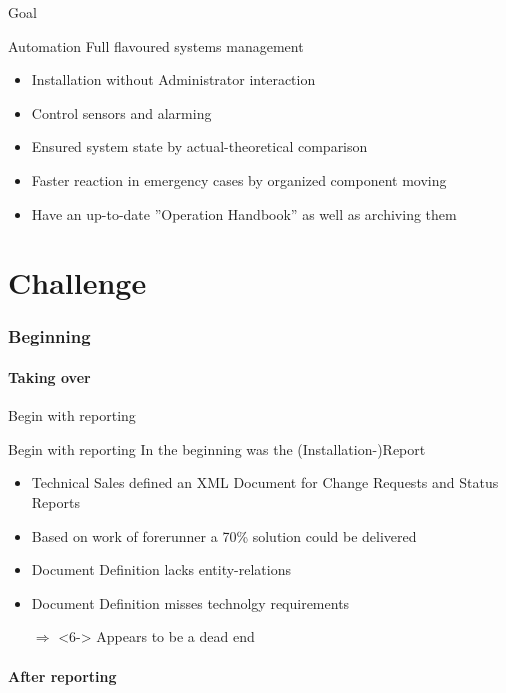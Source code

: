 \documentclass[ngerman,xcolor={table,dvipsnames},smaller,compress,hyperref={bookmarks,colorlinks}]{beamer}%
\begin{document}
\begin{frame}[fragile]{Goal}
\begin{block}{Automation}
Full flavoured systems management
\begin{itemize}
\item<2-> Installation without Administrator interaction
\item<3-> Control sensors and alarming
\item<4-> Ensured system state by actual-theoretical comparison
\item<5-> Faster reaction in emergency cases by organized component moving
\item<6-> Have an up-to-date ''Operation Handbook'' as well as archiving them
\end{itemize}
\end{block}
\end{frame}

\part{Challenge}

\section{Beginning}

\subsection{Taking over}

\begin{frame}[fragile]{Begin with reporting}
\begin{block}{Begin with reporting}
In the beginning was the (Installation-)Report
\begin{itemize}
\item<2-> Technical Sales defined an XML Document for Change Requests and Status Reports
\item<3-> Based on work of forerunner a 70\% solution could be delivered
\item<4-> Document Definition lacks entity-relations
\item<5-> Document Definition misses technolgy requirements
\item[$\Rightarrow$]<6-> Appears to be a dead end
\end{itemize}
\end{block}
\end{frame}

\subsection{After reporting}
\end{document}
